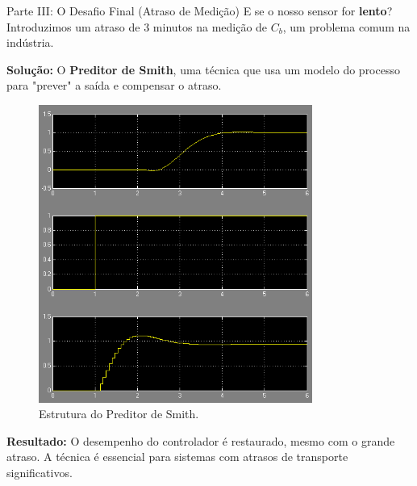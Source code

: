 \documentclass{beamer}
\begin{document}
\begin{frame}{Parte III: O Desafio Final (Atraso de Medição)}
    \large E se o nosso sensor for \textbf{lento}? Introduzimos um atraso de 3 minutos na medição de \(C_b\), um problema comum na indústria.
    \vspace{1em}
    
    \textbf{Solução:} O \textbf{Preditor de Smith}, uma técnica que usa um modelo do processo para "prever" a saída e compensar o atraso.
    
    \begin{figure}
        \includegraphics[width=0.8\textwidth]{Imagens/q13.png}
        \caption{Estrutura do Preditor de Smith.}
    \end{figure}
    
    \textbf{Resultado:} O desempenho do controlador é restaurado, mesmo com o grande atraso. A técnica é essencial para sistemas com atrasos de transporte significativos.
\end{frame}
\end{document}
